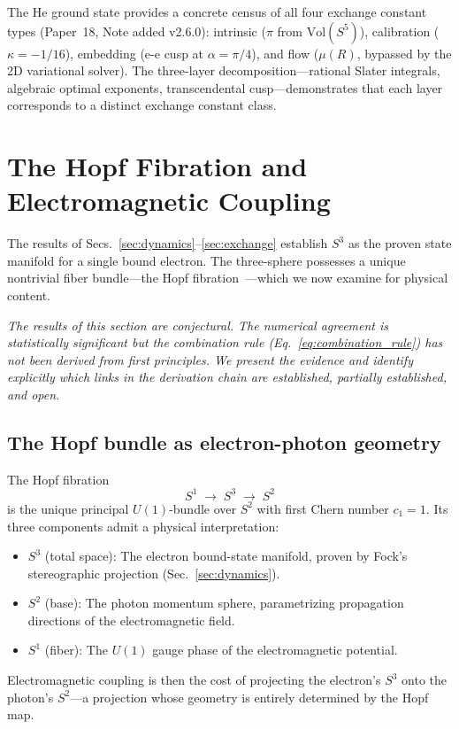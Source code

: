 \documentclass[aps,pra,twocolumn,superscriptaddress,longbibliography]{revtex4-2}
\begin{document}
\noindent
The He ground state provides a concrete census of all four exchange
constant types (Paper~18, Note added v2.6.0): intrinsic ($\pi$ from
$\mathrm{Vol}(S^5)$), calibration ($\kappa = -1/16$), embedding
(e-e cusp at $\alpha = \pi/4$), and flow ($\mu(R)$, bypassed by the
2D variational solver).  The three-layer decomposition---rational
Slater integrals, algebraic optimal exponents, transcendental
cusp---demonstrates that each layer corresponds to a distinct exchange
constant class.


\section{The Hopf Fibration and Electromagnetic Coupling}
\label{sec:alpha}

The results of Secs.~\ref{sec:dynamics}--\ref{sec:exchange} establish
$S^3$ as the proven state manifold for a single bound electron.
The three-sphere possesses a unique nontrivial fiber bundle---the Hopf
fibration~\cite{Hopf1931}---which we now examine for physical content.

\textit{The results of this section are conjectural.  The numerical
agreement is statistically significant but the combination rule
(Eq.~\ref{eq:combination_rule}) has not been derived from first
principles.  We present the evidence and identify explicitly which
links in the derivation chain are established, partially established,
and open.}

\subsection{The Hopf bundle as electron-photon geometry}

The Hopf fibration
\begin{equation}
S^1 \;\longrightarrow\; S^3 \;\longrightarrow\; S^2
\label{eq:hopf}
\end{equation}
is the unique principal $U(1)$-bundle over $S^2$ with first Chern
number $c_1 = 1$.  Its three components admit a physical interpretation:
\begin{itemize}
\item $S^3$ (total space): The electron bound-state manifold, proven by
  Fock's stereographic projection (Sec.~\ref{sec:dynamics}).
\item $S^2$ (base): The photon momentum sphere, parametrizing
  propagation directions of the electromagnetic field.
\item $S^1$ (fiber): The $U(1)$ gauge phase of the electromagnetic
  potential.
\end{itemize}
Electromagnetic coupling is then the cost of projecting the electron's
$S^3$ onto the photon's $S^2$---a projection whose geometry is entirely
determined by the Hopf map.
\end{document}
